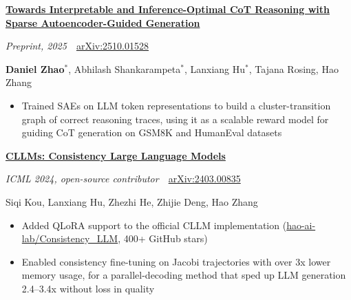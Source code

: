 \documentclass[letterpaper,11pt]{article}
\newcommand{\paper}[4]{%
  \needspace{6\baselineskip}%
  \textbf{\href{https://arxiv.org/abs/#2}{#1}}\par
  \textit{#3}\ \textbar\ \href{https://arxiv.org/abs/#2}{arXiv:#2}\par
  {\fontsize{10pt}{13pt}\selectfont #4\par}}
\newenvironment{bullets}
  {\begin{itemize}[leftmargin=1.2em, label=\textbullet, itemsep=1.5pt, parsep=0pt, topsep=2.5pt, partopsep=0pt]}
  {\end{itemize}\vspace{7.7pt}}
\begin{document}
\paper{Towards Interpretable and Inference-Optimal CoT Reasoning with Sparse Autoencoder-Guided Generation}{2510.01528}
  {Preprint, 2025}
  {\textbf{Daniel Zhao}$^{*}$, Abhilash Shankarampeta$^{*}$, Lanxiang Hu$^{*}$, Tajana Rosing, Hao Zhang}
\begin{bullets}
  \item Trained SAEs on LLM token representations to build a cluster-transition graph of correct reasoning traces, using it as a scalable reward model for guiding CoT generation on GSM8K and HumanEval datasets
\end{bullets}

\paper{CLLMs: Consistency Large Language Models}{2403.00835}
  {ICML 2024, open-source contributor}
  {Siqi Kou, Lanxiang Hu, Zhezhi He, Zhijie Deng, Hao Zhang}
\begin{bullets}
  \item Added QLoRA support to the official CLLM implementation (\href{https://github.com/hao-ai-lab/Consistency_LLM}{hao-ai-lab/Consistency\_LLM}, 400+ GitHub stars)
  \item Enabled consistency fine-tuning on Jacobi trajectories with over 3x lower memory usage, for a parallel-decoding method that sped up LLM generation 2.4--3.4x without loss in quality
\end{bullets}
\end{document}
